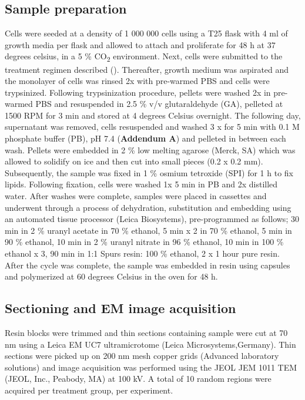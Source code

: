 \subsection{Sample preparation}
Cells were seeded at a density of 1 000 000 cells using a T25 flask with 4 ml of growth media per flask and allowed to attach and proliferate for 48 h at 37 degrees  celsius, in a 5 \% CO\textsubscript{2} environment. Next, cells were submitted to the treatment regimen described (). Thereafter, growth medium was aspirated and the monolayer of cells was rinsed 2x with pre-warmed PBS and cells were trypsinized. Following trypsinization procedure, pellets were washed 2x in pre-warmed PBS and resuspended in 2.5 \% v/v glutaraldehyde (GA), pelleted at 1500 RPM for 3 min and stored at 4 degrees Celsius overnight. The following day, supernatant was removed, cells resuspended and washed 3 x for 5 min with 0.1 M phosphate buffer (PB), pH 7.4 (\textbf{Addendum A}) and pelleted in between each wash. Pellets were embedded in 2 \% low melting agarose (Merck, SA) which was allowed to solidify on ice and then cut into small pieces (0.2 x 0.2 mm). Subsequently, the sample was fixed in 1 \% osmium tetroxide (SPI) for 1 h to fix lipids. Following fixation, cells were washed 1x 5 min in PB and 2x distilled water. After washes were complete, samples were placed in cassettes and underwent through a process of dehydration, substitution and embedding using an automated tissue processor (Leica Biosystems), pre-programmed as follows; 30 min in 2 \% uranyl acetate in 70 \% ethanol, 5 min x 2 in 70 \% ethanol, 5 min in 90 \% ethanol, 10 min in 2 \% uranyl nitrate in 96 \% ethanol, 10 min in 100 \% ethanol x 3, 90 min in 1:1 Spurs resin: 100 \% ethanol, 2 x 1 hour pure resin. After the cycle was complete, the sample was embedded in resin using capsules and polymerized at 60 degrees Celsius in the oven for 48 h.

\subsection{Sectioning and EM image acquisition}
Resin blocks were trimmed and thin sections containing sample were cut at 70 nm using a Leica EM UC7 ultramicrotome (Leica Microsystems,Germany). Thin sections were picked up on 200 nm mesh copper grids (Advanced laboratory solutions) and image acquisition was performed using the JEOL JEM 1011 TEM (JEOL, Inc., Peabody, MA) at 100 kV. A total of 10 random regions were acquired per treatment group, per experiment.  

